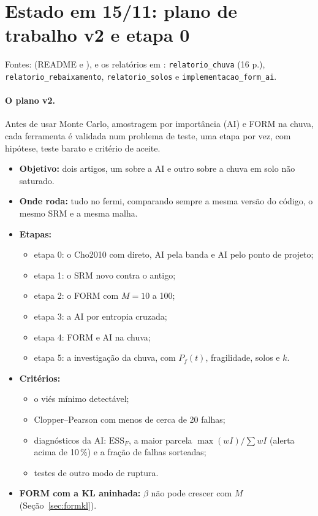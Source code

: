 \section{Estado em 15/11: plano de trabalho v2 e etapa 0}
\label{sec:estado}

Fontes:  (README e ),  e os
relatórios em : \texttt{relatorio\_chuva} (16 p.),
\texttt{relatorio\_rebaixamento}, \texttt{relatorio\_solos} e \texttt{implementacao\_form\_ai}.

\paragraph{O plano v2.} Antes de usar Monte Carlo, amostragem por importância (AI) e FORM na chuva, cada ferramenta é
validada num problema de teste, uma etapa por vez, com hipótese, teste barato e critério de aceite.
\begin{itemize}
  \item \textbf{Objetivo:} dois artigos, um sobre a AI e outro sobre a chuva em solo não saturado.
  \item \textbf{Onde roda:} tudo no fermi, comparando sempre a mesma versão do código, o mesmo SRM e a mesma malha.
  \item \textbf{Etapas:}
    \begin{itemize}
      \item etapa 0: o Cho2010 com direto, AI pela banda e AI pelo ponto de projeto;
      \item etapa 1: o SRM novo contra o antigo;
      \item etapa 2: o FORM com $M = 10$ a 100;
      \item etapa 3: a AI por entropia cruzada;
      \item etapa 4: FORM e AI na chuva;
      \item etapa 5: a investigação da chuva, com $P_f(t)$, fragilidade, solos e $k$.
    \end{itemize}
  \item \textbf{Critérios:}
    \begin{itemize}
      \item o viés mínimo detectável;
      \item Clopper--Pearson com menos de cerca de 20 falhas;
      \item diagnósticos da AI: $\mathrm{ESS}_F$, a maior parcela $\max(wI)/\sum wI$ (alerta acima de 10\,\%) e a fração de
        falhas sorteadas;
      \item testes de outro modo de ruptura.
    \end{itemize}
  \item \textbf{FORM com a KL aninhada:} $\beta$ não pode crescer com $M$ (Seção~\ref{sec:formkl}).
\end{itemize}

